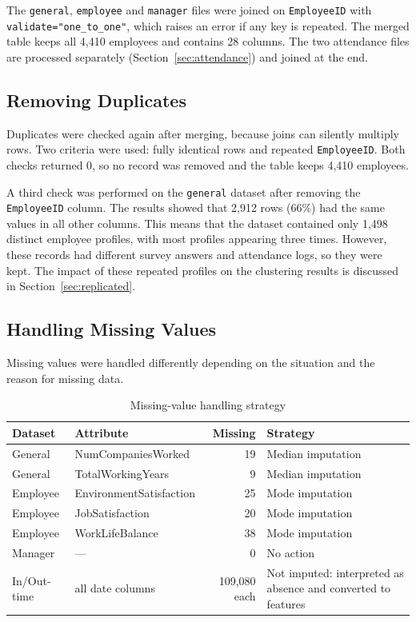 \documentclass[12pt,a4paper]{article}
\begin{document}
The \texttt{general}, \texttt{employee} and \texttt{manager} files were joined
on \texttt{EmployeeID} with \texttt{validate=}\allowbreak\texttt{"one\_to\_one"}, which raises an
error if any key is repeated. The merged table keeps all 4,410 employees and
contains 28 columns. The two attendance files are processed separately
(Section~\ref{sec:attendance}) and joined at the end.

\subsection{Removing Duplicates}

Duplicates were checked again after merging, because joins can silently
multiply rows. Two criteria were used: fully identical rows and repeated
\texttt{EmployeeID}. Both checks returned 0, so no record was removed and the
table keeps 4,410 employees.

A third check was performed on the \texttt{general} dataset after
removing the \texttt{EmployeeID} column. The results showed that
2,912 rows (66\%) had the same values in all other columns.
This means that the dataset contained only 1,498 distinct employee
profiles, with most profiles appearing three times. However, these
records had different survey answers and attendance logs, so they
were kept. The impact of these repeated profiles on the clustering
results is discussed in Section~\ref{sec:replicated}.

\subsection{Handling Missing Values}

Missing values were handled differently depending on the situation and the reason
for missing data.

\begin{table}[H]
\centering
\caption{Missing-value handling strategy}
\label{tab:missing-strategy}
\small
\begin{tabularx}{\textwidth}{l l r X}
\toprule
\textbf{Dataset} & \textbf{Attribute} & \textbf{Missing} & \textbf{Strategy}\\
\midrule
General  & NumCompaniesWorked      & 19 & Median imputation\\
General  & TotalWorkingYears       & 9  & Median imputation\\
Employee & EnvironmentSatisfaction & 25 & Mode imputation\\
Employee & JobSatisfaction         & 20 & Mode imputation\\
Employee & WorkLifeBalance         & 38 & Mode imputation\\
Manager  & ---                     & 0  & No action\\
In/Out-time & all date columns     & 109,080 each & Not imputed: interpreted as absence and
                                   converted to features\\
\bottomrule
\end{tabularx}
\end{table}
\end{document}
